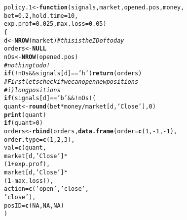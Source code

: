 \documentclass{article}\usepackage[]{graphicx}\usepackage[]{color}
\makeatletter
\newcommand{\hlnum}[1]{\textcolor[rgb]{0.686,0.059,0.569}{#1}}%
\newcommand{\hlstr}[1]{\textcolor[rgb]{0.192,0.494,0.8}{#1}}%
\newcommand{\hlcom}[1]{\textcolor[rgb]{0.678,0.584,0.686}{\textit{#1}}}%
\newcommand{\hlopt}[1]{\textcolor[rgb]{0,0,0}{#1}}%
\newcommand{\hlstd}[1]{\textcolor[rgb]{0.345,0.345,0.345}{#1}}%
\newcommand{\hlkwa}[1]{\textcolor[rgb]{0.161,0.373,0.58}{\textbf{#1}}}%
\newcommand{\hlkwb}[1]{\textcolor[rgb]{0.69,0.353,0.396}{#1}}%
\newcommand{\hlkwc}[1]{\textcolor[rgb]{0.333,0.667,0.333}{#1}}%
\newcommand{\hlkwd}[1]{\textcolor[rgb]{0.737,0.353,0.396}{\textbf{#1}}}%
\newenvironment{kframe}{%
 \def\at@end@of@kframe{}%
 \ifinner\ifhmode%
  \def\at@end@of@kframe{\end{minipage}}%
  \begin{minipage}{\columnwidth}%
 \fi\fi%
 \def\FrameCommand##1{\hskip\@totalleftmargin \hskip-\fboxsep
 \colorbox{shadecolor}{##1}\hskip-\fboxsep
     \hskip-\linewidth \hskip-\@totalleftmargin \hskip\columnwidth}%
 \MakeFramed {\advance\hsize-\width
   \@totalleftmargin\z@ \linewidth\hsize
   \@setminipage}}%
 {\par\unskip\endMakeFramed%
 \at@end@of@kframe}
\newenvironment{knitrout}{}{} %
\makeatother
\begin{document}
\begin{knitrout}
\color{fgcolor}\begin{kframe}
\begin{alltt}
\hlstd{policy.1} \hlkwb{<-} \hlkwa{function}\hlstd{(}\hlkwc{signals}\hlstd{,} \hlkwc{market}\hlstd{,} \hlkwc{opened.pos}\hlstd{,} \hlkwc{money}\hlstd{,}
                     \hlkwc{bet} \hlstd{=} \hlnum{0.2}\hlstd{,} \hlkwc{hold.time} \hlstd{=} \hlnum{10}\hlstd{,}
                     \hlkwc{exp.prof} \hlstd{=} \hlnum{0.025}\hlstd{,} \hlkwc{max.loss} \hlstd{=} \hlnum{0.05}\hlstd{)}
\hlstd{\{}
  \hlstd{d} \hlkwb{<-} \hlkwd{NROW}\hlstd{(market)} \hlcom{# this is the ID of today}
  \hlstd{orders} \hlkwb{<-} \hlkwa{NULL}
  \hlstd{nOs} \hlkwb{<-} \hlkwd{NROW}\hlstd{(opened.pos)}
  \hlcom{#nothing to do!}
  \hlkwa{if}\hlstd{(}\hlopt{!}\hlstd{nOs} \hlopt{&&} \hlstd{signals[d]} \hlopt{==} \hlstr{'h'}\hlstd{)} \hlkwd{return} \hlstd{(orders)}
  \hlcom{#First lets check if we can open new positions}
  \hlcom{#i)long positions}
  \hlkwa{if}\hlstd{(signals[d]} \hlopt{==} \hlstr{'b'} \hlopt{&& !}\hlstd{nOs)\{}
    \hlstd{quant} \hlkwb{<-} \hlkwd{round}\hlstd{(bet}\hlopt{*}\hlstd{money}\hlopt{/}\hlstd{market[d,} \hlstr{'Close'}\hlstd{],} \hlnum{0}\hlstd{)}
    \hlkwd{print}\hlstd{(quant)}
    \hlkwa{if}\hlstd{(quant} \hlopt{>} \hlnum{0}\hlstd{)}
      \hlstd{orders} \hlkwb{<-} \hlkwd{rbind}\hlstd{(orders,} \hlkwd{data.frame}\hlstd{(}\hlkwc{order} \hlstd{=} \hlkwd{c}\hlstd{(}\hlnum{1}\hlstd{,} \hlopt{-}\hlnum{1}\hlstd{,} \hlopt{-}\hlnum{1}\hlstd{),}
                                         \hlkwc{order.type} \hlstd{=} \hlkwd{c}\hlstd{(}\hlnum{1}\hlstd{,} \hlnum{2}\hlstd{,} \hlnum{3}\hlstd{),}
                                         \hlkwc{val} \hlstd{=} \hlkwd{c}\hlstd{(quant,}
                                                 \hlstd{market[d,} \hlstr{'Close'}\hlstd{]}\hlopt{*}
                                                   \hlstd{(}\hlnum{1}\hlopt{+}\hlstd{exp.prof),}
                                                 \hlstd{market[d,} \hlstr{'Close'}\hlstd{]}\hlopt{*}
                                                   \hlstd{(}\hlnum{1} \hlopt{-} \hlstd{max.loss)),}
                                         \hlkwc{action} \hlstd{=} \hlkwd{c}\hlstd{(}\hlstr{'open'}\hlstd{,} \hlstr{'close'}\hlstd{,}
                                                    \hlstr{'close'}\hlstd{),}
                                         \hlkwc{posID} \hlstd{=} \hlkwd{c}\hlstd{(}\hlnum{NA}\hlstd{,} \hlnum{NA}\hlstd{,} \hlnum{NA}\hlstd{)}
                                         \hlstd{)}

\end{alltt}
\end{kframe}
\end{knitrout}
\end{document}
